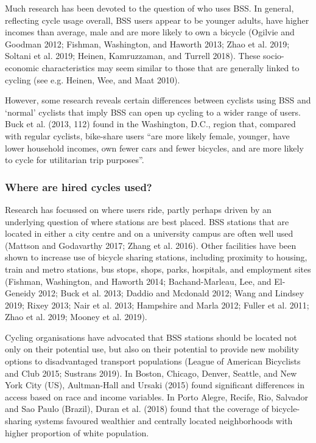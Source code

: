 \documentclass[]{article}
\begin{document}
Much research has been devoted to the question of who uses BSS.
In general, reflecting cycle usage overall, BSS users appear to be younger adults, have higher incomes than average, male and are more likely to own a bicycle (Ogilvie and Goodman 2012; Fishman, Washington, and Haworth 2013; Zhao et al. 2019; Soltani et al. 2019; Heinen, Kamruzzaman, and Turrell 2018).
These socio-economic characteristics may seem similar to those that are generally linked to cycling (see e.g. Heinen, Wee, and Maat 2010).

However, some research reveals certain differences between cyclists using BSS and `normal' cyclists that imply BSS can open up cycling to a wider range of users.
Buck et al. (2013, 112) found in the Washington, D.C., region that, compared with regular cyclists, bike-share users ``are more likely female, younger, have lower household incomes, own fewer cars and fewer bicycles, and are more likely to cycle for utilitarian trip purposes''.

\hypertarget{where-are-hired-cycles-used}{%
\subsubsection{Where are hired cycles used?}\label{where-are-hired-cycles-used}}

Research has focussed on where users ride, partly perhaps driven by an underlying question of where stations are best placed. BSS stations that are located in either a city centre and on a university campus are often well used (Mattson and Godavarthy 2017; Zhang et al. 2016).
Other facilities have been shown to increase use of bicycle sharing stations, including proximity to housing, train and metro stations, bus stops, shops, parks, hospitals, and employment sites (Fishman, Washington, and Haworth 2014; Bachand-Marleau, Lee, and El-Geneidy 2012; Buck et al. 2013; Daddio and Mcdonald 2012; Wang and Lindsey 2019; Rixey 2013; Nair et al. 2013; Hampshire and Marla 2012; Fuller et al. 2011; Zhao et al. 2019; Mooney et al. 2019).

Cycling organisations have advocated that BSS stations should be located not only on their potential use, but also on their potential to provide new mobility options to disadvantaged transport populations (League of American Bicyclists and Club 2015; Sustrans 2019).
In Boston, Chicago, Denver, Seattle, and New York City (US), Aultman-Hall and Ursaki (2015) found significant differences in access based on race and income variables.
In Porto Alegre, Recife, Rio, Salvador and Sao Paulo (Brazil), Duran et al. (2018) found that the coverage of bicycle-sharing systems favoured wealthier and centrally located neighborhoods with higher proportion of white population.
\end{document}
